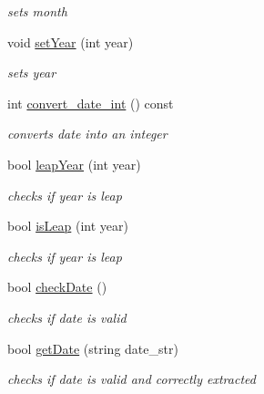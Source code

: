 \begin{DoxyCompactItemize}
\begin{DoxyCompactList}\small\item\em sets month \end{DoxyCompactList}\item 
void \hyperlink{class_date_a895c4ae9868e43577cf59d9c679d7a71}{set\+Year} (int year)
\begin{DoxyCompactList}\small\item\em sets year \end{DoxyCompactList}\item 
int \hyperlink{class_date_a8e10a688e6056a4d62a8c5ba5de11e54}{convert\+\_\+date\+\_\+int} () const
\begin{DoxyCompactList}\small\item\em converts date into an integer \end{DoxyCompactList}\item 
bool \hyperlink{class_date_ac44b1159cfc6b4936fddd909b0c2a8f1}{leap\+Year} (int year)
\begin{DoxyCompactList}\small\item\em checks if year is leap \end{DoxyCompactList}\item 
bool \hyperlink{class_date_ab068a7017e7033adba1680de395c844e}{is\+Leap} (int year)
\begin{DoxyCompactList}\small\item\em checks if year is leap \end{DoxyCompactList}\item 
bool \hyperlink{class_date_ac4810ddec014ca51257871abac9667a9}{check\+Date} ()
\begin{DoxyCompactList}\small\item\em checks if date is valid \end{DoxyCompactList}\item 
bool \hyperlink{class_date_a5693be8bccd3d4bd431a2cb0ae042d02}{get\+Date} (string date\+\_\+str)
\begin{DoxyCompactList}\small\item\em checks if date is valid and correctly extracted \end{DoxyCompactList}\end{DoxyCompactItemize}
